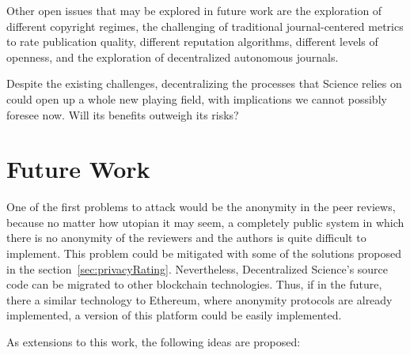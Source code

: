 Other open issues that may be explored in future work are the exploration of
different copyright regimes, the challenging of traditional journal-centered
metrics to rate publication quality, different reputation algorithms, different
levels of openness, and the exploration of decentralized autonomous journals.

Despite the existing challenges, decentralizing the processes that Science
relies on could open up a whole new playing field, with implications we cannot
possibly foresee now. Will its benefits outweigh its risks?

\section{Future Work}

One of the first problems to attack would be the anonymity in the peer reviews,
because no matter how utopian it may seem, a completely public system in which
there is no anonymity of the reviewers and the authors is quite difficult to
implement. This problem could be mitigated with some of the solutions proposed
in the section~\ref{sec:privacyRating}. Nevertheless, Decentralized Science's
source code can be migrated to other blockchain technologies. Thus, if in the
future, there a similar technology to Ethereum, where anonymity protocols are
already implemented, a version of this platform could be easily implemented.

As extensions to this work, the following ideas are proposed:

